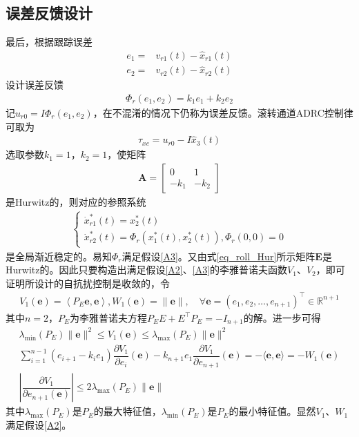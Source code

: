 \subsection{误差反馈设计}	
最后，根据跟踪误差
\begin{align}
e_{1} =& v_{r1}(t)-\hat{x}_{r1}(t) \\
e_{2} =& v_{r2}(t)-\hat{x}_{r2}(t)
\end{align}
设计误差反馈
\begin{align}
\Phi_r (e_1,e_2)= k_{1} e_{1}+k_{2} e_{2} 	\label{NLSEF}
\end{align}
记$u_{r0} =I \Phi_r (e_1,e_2) $，在不混淆的情况下仍称为误差反馈。滚转通道ADRC控制律可取为
\begin{align}
\tau_{xc} = u_{r0} -I\hat{x}_{3}(t)	\label{eq_roll_cl}
\end{align}
选取参数$ k_{1}=1 $，$ k_{2}=1 $，使矩阵
\begin{align}
\bm{A}=\begin{bmatrix}
0 & 1 \\
-k_{1} & -k_{2}
\end{bmatrix}
\end{align}
是Hurwitz的，则对应的参照系统
\begin{align}\left\{\begin{array}{l}
\dot{x}_{r1}^{*}(t)=x_{2}^{*}(t) \\
\dot{x}_{r2}^{*}(t)= \Phi_r\left(x_{1}^{*}(t), x_{2}^{*}(t)\right), \Phi_r(0,0)=0
\end{array}\right.	\label{eq_sec_ref_sys}
\end{align}
是全局渐近稳定的。易知$ \Phi_r $满足假设\ref{A3}。又由式\eqref{eq_roll_Hur}所示矩阵$ \bm{E} $是Hurwitz的。因此只要构造出满足假设\ref{A2}、\ref{A3}的李雅普诺夫函数$ V_1 $、$ V_2 $，即可证明所设计的自抗扰控制是收敛的，令
\begin{align}V_{1}(\bm{e})=\left\langle P_{E} \bm{e}, \bm{e}\right\rangle, W_{1}(\bm{e})=\|\bm{e}\|, \quad \forall \bm{e}=\left(e_{1}, e_{2}, \ldots, e_{n+1}\right)^{\top} \in \mathbb{R}^{n+1}\end{align}
其中$ n=2 $，$ P_{E} $为李雅普诺夫方程$P_{E} E+E^{\top} P_{E}=-I_{n+1}$的解。进一步可得
\begin{gather}
\lambda_{\min }\left(P_{E}\right)\|\bm{e}\|^{2} \leq V_{1}(\bm{e}) \leq \lambda_{\max }\left(P_{E}\right)\|\bm{e}\|^{2} \\
\sum_{i=1}^{n-1}\left(e_{i+1}-k_{i} e_{1}\right) \dfrac{\partial V_{1}}{\partial e_{i}}(\bm{e})-k_{n+1} e_{1} \dfrac{\partial V_{1}}{\partial e_{n+1}}(\bm{e})=-\langle \bm{e}, \bm{e}\rangle=-W_{1}(\bm{e}) \\
\left|\dfrac{\partial V_{1}}{\partial e_{n+1}(\bm{e})}\right| \leq 2 \lambda_{\max }\left(P_{E}\right)\|\bm{e}\|
\end{gather}
其中$\lambda_{\max }\left(P_{E}\right)$是$ P_E $的最大特征值，$ \lambda_{\min }\left(P_{E}\right) $是$ P_E $的最小特征值。显然$ V_1 $、$ W_1 $满足假设\ref{A2}。

